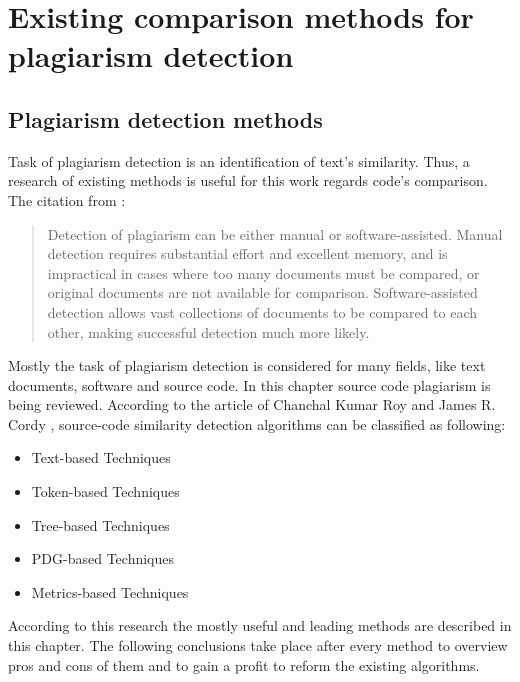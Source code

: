 \documentclass{report}
\begin{document}
\chapter{Existing comparison methods for plagiarism detection}
\label{cha:methods}
\section{Plagiarism detection methods}
\label{sec: plagiarism_methods}

Task of plagiarism detection is an identification of text's similarity. Thus, a research of existing methods is useful for this work regards code's comparison.
The citation from \cite{software_clone_detection}:
\begin{quote} Detection of plagiarism can be either manual or software-assisted. Manual detection requires substantial effort and excellent memory, and is impractical in cases where too many documents must be compared, or original documents are not available for comparison. Software-assisted detection allows vast collections of documents to be compared to each other, making successful detection much more likely.\end{quote}

\noindent
Mostly the task of plagiarism detection is considered for many fields, like text documents, software and source code. In this chapter source code plagiarism is being reviewed.
According to the article of Chanchal Kumar Roy and James R. Cordy \cite{software_clone_detection}, source-code similarity detection algorithms can be classified as following:
\begin{itemize}
	\item Text-based Techniques
	\item Token-based Techniques
	\item Tree-based Techniques
	\item PDG-based Techniques
	\item Metrics-based Techniques
\end{itemize}
According to this research the mostly useful and leading methods are described in this chapter. The following conclusions take place after every method to overview pros and cons of them and to gain a profit to reform the existing algorithms. 
\end{document}
